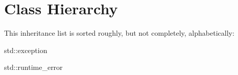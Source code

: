 \section{Class Hierarchy}
This inheritance list is sorted roughly, but not completely, alphabetically\+:\begin{DoxyCompactList}
\item {}
\begin{DoxyCompactList}
\item {}
\item {}
\end{DoxyCompactList}
\item {}
\begin{DoxyCompactList}
\item {}
\end{DoxyCompactList}
\item {}
\item std\+:\+:exception\begin{DoxyCompactList}
\item std\+:\+:runtime\+\_\+error\begin{DoxyCompactList}
\item {}
\end{DoxyCompactList}
\end{DoxyCompactList}
\end{DoxyCompactList}
